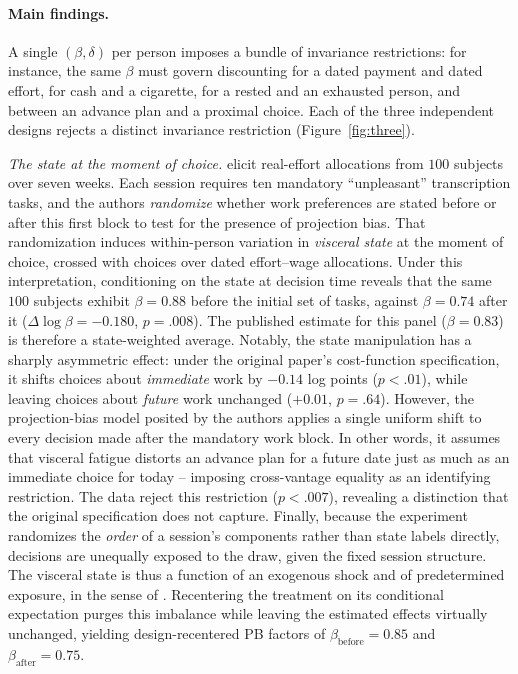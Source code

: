 \documentclass[11pt,a4paper]{article}
\theoremstyle{plain}
\theoremstyle{definition}
\begin{document}
\paragraph{Main findings.} A single $(\beta,\delta)$ per person imposes a bundle of invariance restrictions: for instance, the same $\beta$ must govern discounting for a dated payment and dated effort, for cash and a cigarette, for a rested and an exhausted person, and between an advance plan and a proximal choice.
Each of the three independent designs rejects a distinct invariance restriction (Figure~\ref{fig:three}).




\emph{The state at the moment of choice.} 
\citet{augenblick2019} elicit real-effort allocations from $100$ subjects over seven weeks. Each session requires ten mandatory ``unpleasant'' transcription tasks, and the authors \emph{randomize} whether work preferences are stated before or after this first block to test for the presence of projection bias. That randomization induces within-person variation in \emph{visceral state} at the moment of choice, %
crossed with choices over dated effort--wage allocations.
Under this interpretation, conditioning on the %
state at decision time reveals that the same $100$ subjects exhibit $\beta=0.88$ %
before the initial set of tasks, against $\beta=0.74$ %
after it ($\Delta\log\beta=-0.180$, $p=.008$).
The published estimate for this panel ($\beta=0.83$) is therefore a state-weighted average. Notably, the state manipulation has a sharply asymmetric effect: under the original paper's cost-function specification, %
it shifts choices about \emph{immediate} work by $-0.14$ log points ($p<.01$), while leaving choices about \emph{future} work unchanged ($+0.01$, $p=.64$).
However, the projection-bias model posited by the authors applies a single uniform shift to every decision made after the mandatory work block. In other words, it assumes that visceral fatigue distorts an advance plan for a future date just as much as an immediate choice for today -- imposing cross-vantage equality as an identifying restriction. The data %
reject this restriction ($p<.007$), revealing a distinction that the original specification does not capture.
Finally, because the experiment randomizes the \emph{order} of a session's components rather than state labels directly, decisions are unequally exposed to the draw, given the fixed session structure. The visceral state is thus a function of an exogenous shock and of predetermined exposure, in the sense of \citet{borusyak2023}.
Recentering the treatment on its conditional expectation purges this imbalance while leaving the estimated effects virtually unchanged, yielding design-recentered PB factors of $\beta_{\mathrm{before}}=0.85$ and $\beta_{\mathrm{after}}=0.75$.
\end{document}
